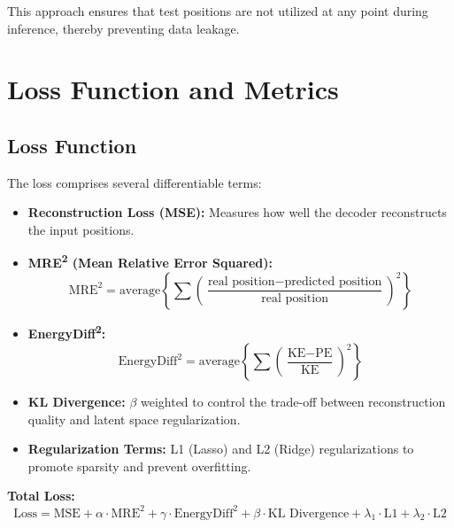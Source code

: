 \documentclass[a4paper,10pt]{article}
\begin{document}
This approach ensures that test positions are not utilized at any point during inference, thereby preventing data leakage.

\section{Loss Function and Metrics}

\subsection{Loss Function}
The loss comprises several differentiable terms:
\begin{itemize}[leftmargin=*]
    \item \textbf{Reconstruction Loss (MSE):} Measures how well the decoder reconstructs the input positions.
    \item \textbf{MRE\textsuperscript{2} (Mean Relative Error Squared):}
    \begin{equation}
    \text{MRE}^2 = \text{average} \left\{ \sum \left( \frac{\text{real position} - \text{predicted position}}{\text{real position}} \right)^2 \right\}
    \end{equation}
    \item \textbf{EnergyDiff\textsuperscript{2}:}
    \begin{equation}
    \text{EnergyDiff}^2 = \text{average} \left\{ \sum \left( \frac{\text{KE} - \text{PE}}{\text{KE}} \right)^2 \right\}
    \end{equation}
    \item \textbf{KL Divergence:} \( \beta \) weighted to control the trade-off between reconstruction quality and latent space regularization.
    \item \textbf{Regularization Terms:} L1 (Lasso) and L2 (Ridge) regularizations to promote sparsity and prevent overfitting.
\end{itemize}

\textbf{Total Loss:}
\begin{equation}
\text{Loss} = \text{MSE} + \alpha \cdot \text{MRE}^2 + \gamma \cdot \text{EnergyDiff}^2 + \beta \cdot \text{KL Divergence} + \lambda_1 \cdot \text{L1} + \lambda_2 \cdot \text{L2}
\end{equation}
\end{document}
